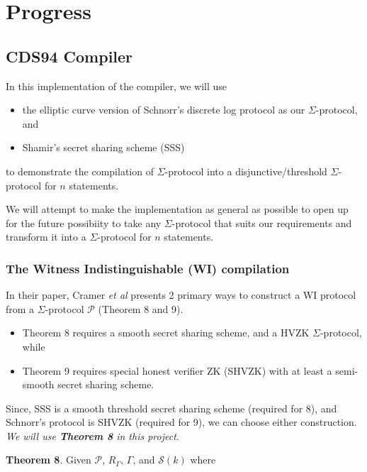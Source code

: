 \section{Progress}
\label{sec:progress}

\subsection{CDS94 Compiler}
In this implementation of the compiler, we will use 

\begin{itemize}
    \item the elliptic curve version of Schnorr's discrete log protocol as our $\Sigma$-protocol, and
    \item Shamir's secret sharing scheme (SSS)
\end{itemize}

to demonstrate the compilation of $\Sigma$-protocol into a disjunctive/threshold $\Sigma$-protocol for $n$ statements. 

We will attempt to make the implementation as general as possible to open up for the future possibiity to take any $\Sigma$-protocol that suits our requirements and transform it into a $\Sigma$-protocol for $n$ statements.  

\subsubsection{The Witness Indistinguishable (WI) compilation}

In their paper, Cramer {\em{et al}} presents 2 primary ways to construct a WI protocol from a $\Sigma$-protocol $\mathcal P$ (Theorem 8 and 9). 

\begin{itemize}
    \item Theorem 8 requires a smooth secret sharing scheme, and a HVZK $\Sigma$-protocol, while
    \item Theorem 9 requires special honest verifier ZK (SHVZK) with at least a semi-smooth secret sharing scheme.
\end{itemize}

Since, SSS is a smooth threshold secret sharing scheme (required for 8), and Schnorr's protocol is SHVZK (required for 9), we can choose either construction. 
\textit{We will use \textbf{Theorem 8} in this project.}

\textbf{Theorem 8}. Given $\mathcal P$, $R_\Gamma$, $\Gamma$, and $\mathcal S(k)$ where


